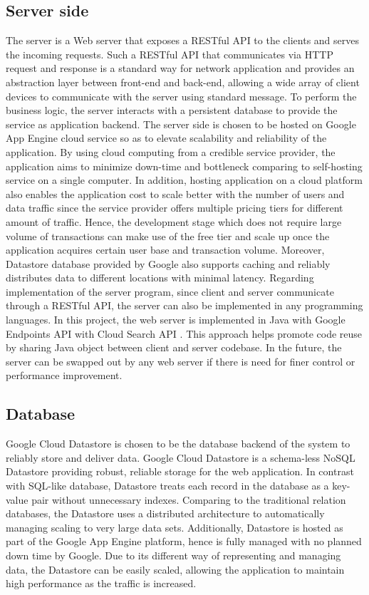 \subsection{Server side}
The server is a Web server that exposes a RESTful API to the clients and serves the incoming requests. Such a RESTful
API that communicates via HTTP request and response is a standard way for network application and provides an
abstraction layer between front-end and back-end, allowing a wide array of client devices to communicate with the
server using standard message. To perform the business logic, the server interacts with a persistent database to provide
the service as application backend.  The server side is chosen to be hosted on Google App Engine cloud service so as to
elevate scalability and reliability of the application. By using cloud computing from a credible service provider, the
application aims to minimize down-time and bottleneck comparing to self-hosting service on a single computer. In
addition, hosting application on a cloud platform also enables the application cost to scale better with the number of
users and data traffic since the service provider offers multiple pricing tiers for different amount of traffic. Hence,
the development stage which does not require large volume of transactions can make use of the free tier and scale up
once the application acquires certain user base and transaction volume. Moreover, Datastore database provided by Google
also supports caching and reliably distributes data to different locations with minimal latency.  Regarding
implementation of the server program, since client and server communicate through a RESTful API, the server can also be
implemented in any programming languages. In this project, the web server is implemented in Java with Google Endpoints
API \cite{CloudEndpoints} with Cloud Search API \cite{SearchAPI}.  This approach helps promote code reuse by sharing
Java object between client and server codebase. In the future, the server can be swapped out by any web server if there
is need for finer control or performance improvement.

\subsection{Database}
Google Cloud Datastore is chosen to be the database backend of the system to reliably store and deliver data. Google
Cloud Datastore is a schema-less NoSQL Datastore providing robust, reliable storage for the web application. In
contrast with SQL-like database, Datastore treats each record in the database as a key-value pair without unnecessary
indexes. Comparing to the traditional relation databases, the Datastore uses a distributed architecture to automatically
managing scaling to very large data sets. Additionally, Datastore is hosted as part of the Google App Engine platform,
hence is fully managed with no planned down time by Google. Due to its different way of representing and managing data,
the Datastore can be easily scaled, allowing the application to maintain high performance as the traffic is increased.

